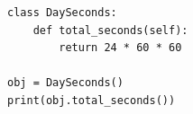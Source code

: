 \begin{verbatim}
class DaySeconds:
    def total_seconds(self):
        return 24 * 60 * 60

obj = DaySeconds()
print(obj.total_seconds())
\end{verbatim}